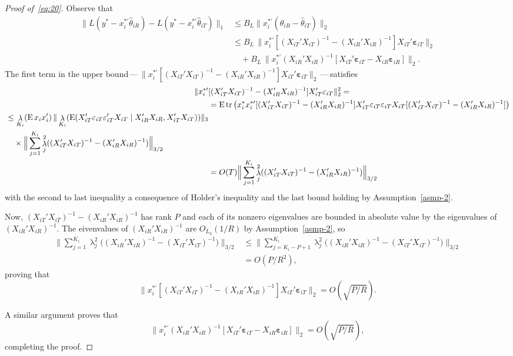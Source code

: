 \documentclass[11pt]{article}
\newcommand{\e}{\varepsilon}
\newcommand{\eb}{\mathbf{\e}}
\DeclareMathOperator{\eigen}{\lambda}
\begin{document}
\begin{proof}[Proof of~\eqref{eq:20}]
Observe that
\begin{align*}
  \|L(y^{*} -  x_i^{*\prime} \hat{\theta}_{iR}) -
  L(y^{*} - x_i^{*\prime} \hat{\theta}_{iT}) \|_1
  &\leq B_{L} \| x_i^{*\prime} (\hat{\theta}_{iR} - \hat{\theta}_{iT}) \|_2 \\
  &\leq B_{L} \, \| x_i^{*\prime} [(X_{iT}'X_{iT})^{-1} -
  (X_{iR}'X_{iR})^{-1}] X_{iT}' \eb_{iT} \|_2 \\
  &\quad+ B_L \, \| x_i^{*\prime}
  (X_{iR}'X_{iR})^{-1}[X_{iT}'\eb_{iT} - X_{iR}
  \eb_{iR} ] \|_2 .
\end{align*}
The first term in the upper bound\,---\,$\| x_i^{*\prime}
[(X_{iT}'X_{iT})^{-1} - (X_{iR}'X_{iR})^{-1}] X_{iT}' \eb_{iT} \|_2$\,---\,satisfies
\begin{align*}
  \| x_i^{*\prime} &[(X_{iT}'X_{iT})^{-1} -
  (X_{iR}'X_{iR})^{-1}] X_{iT}' \eb_{iT} \|_2^2 =\\
  &= \E \tr\big( x_i^* x_i^{*\prime}
   [(X_{iT}'X_{iT})^{-1} - (X_{iR}'X_{iR})^{-1}] X_{iT}'\eb_{iT} \eb_{iT}X_{iT}
   [(X_{iT}'X_{iT})^{-1} - (X_{iR}'X_{iR})^{-1}] \big) \\ \label{eq:8}
  \begin{split}&\leq
    \eigen_{K_i}(\E x_i x_i')
    \, \| \eigen_{K_i}(\E(X_{iT}' \eb_{iT} \eb_{iT}' X_{iT} \mid
    X_{iR}'X_{iR}, X_{iT}'X_{iT})) \|_3 \\
    & \quad \times \Big\|\sum_{j=1}^{K_i}
    \eigen_j^2((X_{iT}'X_{iT})^{-1} - (X_{iR}'X_{iR})^{-1}) \Big\|_{3/2}
  \end{split} \\
  &= O(T) \Big\|\sum_{j=1}^{K_i}
    \eigen_j^2((X_{iT}'X_{iT})^{-1} - (X_{iR}'X_{iR})^{-1}) \Big\|_{3/2}
\end{align*}
with the second to last inequality a consequence of Holder's
inequality and the last bound holding by Assumption~\ref{asmp-2}.

Now, $(X_{iT}'X_{iT})^{-1} - (X_{iR}'X_{iR})^{-1}$ has rank $P$ and
each of its nonzero eigenvalues are bounded in absolute value by the
eigenvalues of $(X_{iR}'X_{iR})^{-1}$. The eivenvalues of
$(X_{iR}'X_{iR})^{-1}$ are $O_{L_3}(1/R)$ by Assumption~\ref{asmp-2}, so
\begin{align*}
  \Big\|\sum_{j=1}^{K_i}
  \eigen_j^2\big((X_{iR}'X_{iR})^{-1} - (X_{iT}'X_{iT})^{-1}\big)\Big\|_{3/2}
  &\leq \Big\|\sum_{j=K_i - P+1}^{K_i}
  \eigen_j^2\big((X_{iR}'X_{iR})^{-1} - (X_{iT}'X_{iT})^{-1}\big) \Big\|_{3/2} \\
  &= O(P/R^2),
\end{align*}
proving that
\begin{equation*}
  \| x_i^{*\prime} [(X_{iT}'X_{iT})^{-1} -
  (X_{iR}'X_{iR})^{-1}] X_{iT}' \eb_{iT} \|_2 = O(\sqrt{P/R}).
\end{equation*}

A similar argument proves that
\begin{equation*}
  \big\| x_i^{*\prime} (X_{iR}'X_{iR})^{-1}
  [X_{iT}'\eb_{iT} - X_{iR} \eb_{iR} ] \big\|_2 =  O(\sqrt{P/R}),
\end{equation*}
completing the proof.
\end{proof}
\end{document}
